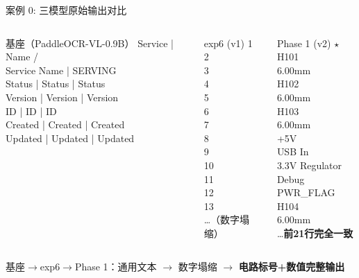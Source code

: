 \documentclass[10pt,aspectratio=169,table]{beamer}
\begin{document}
\begin{frame}{案例 0: 三模型原始输出对比}
  \begin{columns}[T]
      \begin{block}{\footnotesize 基座（PaddleOCR-VL-0.9B）}
        \ttfamily\tiny
        Service | Name /\\ Service Name | SERVING\\
        Status | Status | Status\\
        Version | Version | Version\\
        ID | ID | ID\\
        Created | Created | Created\\
        Updated | Updated | Updated
      \end{block}
      \begin{block}{\footnotesize exp6 (v1)}
        \ttfamily\tiny
        1\\
        2\\
        3\\
        4\\
        5\\
        6\\
        7\\
        8\\
        9\\
        10\\
        11\\
        12\\
        13\\
        \ldots（数字塌缩）
      \end{block}
      \begin{block}{\footnotesize Phase 1 (v2) $\star$}
        \ttfamily\tiny
        H101\\
        6.00mm\\
        H102\\
        6.00mm\\
        H103\\
        6.00mm\\
        +5V\\
        USB In\\
        3.3V Regulator\\
        Debug\\
        PWR\_FLAG\\
        H104\\
        6.00mm\\
        \ldots\textbf{前21行完全一致}
      \end{block}
  \end{columns}
  \vspace{0.2cm}
  \begin{center}
    \footnotesize 基座$\to$exp6$\to$Phase 1：通用文本 $\to$ 数字塌缩 $\to$ \textbf{电路标号+数值完整输出}
  \end{center}
\end{frame}
\end{document}
